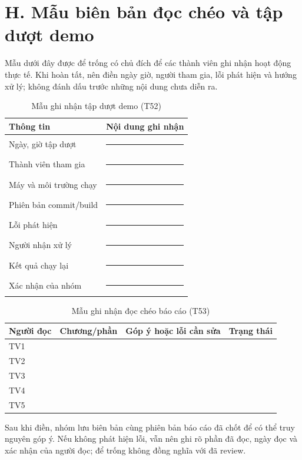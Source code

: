 \clearpage
\section*{H. Mẫu biên bản đọc chéo và tập dượt demo}
Mẫu dưới đây được để trống có chủ đích để các thành viên ghi nhận hoạt động thực tế. Khi hoàn tất, nên điền ngày giờ, người tham gia, lỗi phát hiện và hướng xử lý; không đánh dấu trước những nội dung chưa diễn ra.

\begin{table}[H]
\centering
\caption{Mẫu ghi nhận tập dượt demo (T52)}
\small
\begin{tabular}{@{}p{4cm}p{9cm}@{}}
\toprule
\textbf{Thông tin} & \textbf{Nội dung ghi nhận} \\
\midrule
Ngày, giờ tập dượt & \rule{8cm}{0.4pt} \\
Thành viên tham gia & \rule{8cm}{0.4pt} \\
Máy và môi trường chạy & \rule{8cm}{0.4pt} \\
Phiên bản commit/build & \rule{8cm}{0.4pt} \\
Lỗi phát hiện & \rule{8cm}{0.4pt} \\
Người nhận xử lý & \rule{8cm}{0.4pt} \\
Kết quả chạy lại & \rule{8cm}{0.4pt} \\
Xác nhận của nhóm & \rule{8cm}{0.4pt} \\
\bottomrule
\end{tabular}
\end{table}

\begin{table}[H]
\centering
\caption{Mẫu ghi nhận đọc chéo báo cáo (T53)}
\small
\begin{tabular}{@{}p{2.4cm}p{2.4cm}p{5.7cm}p{2.1cm}@{}}
\toprule
\textbf{Người đọc} & \textbf{Chương/phần} & \textbf{Góp ý hoặc lỗi cần sửa} & \textbf{Trạng thái} \\
\midrule
TV1 & & & \\
TV2 & & & \\
TV3 & & & \\
TV4 & & & \\
TV5 & & & \\
\bottomrule
\end{tabular}
\end{table}

\noindent Sau khi điền, nhóm lưu biên bản cùng phiên bản báo cáo đã chốt để có thể truy nguyên góp ý. Nếu không phát hiện lỗi, vẫn nên ghi rõ phần đã đọc, ngày đọc và xác nhận của người đọc; để trống không đồng nghĩa với đã review.
